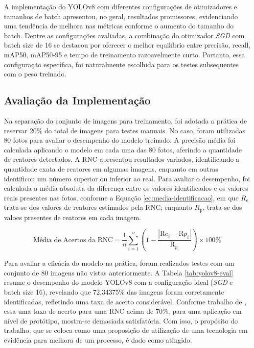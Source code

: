 A implementação do YOLOv8 com diferentes configurações de otimizadores e tamanhos de batch apresentou, no geral, resultados promissores, evidenciando uma tendência de melhora nas métricas conforme o aumento do tamanho do batch. Dentre as configurações avaliadas, a combinação do otimizador \textit{SGD} com batch size de 16 se destacou por oferecer o melhor equilíbrio entre precisão, recall, mAP50, mAP50-95 e tempo de treinamento razoavelmente curto. Portanto, essa configuração específica, foi naturalmente escolhida para os testes subsequentes com o peso treinado.

\subsection{Avaliação da Implementação}

Na separação do conjunto de imagens para treinamento, foi adotada a prática de reservar 20\% do total de imagens para testes manuais. No caso, foram utilizadas 80 fotos para avaliar o desempenho do modelo treinado. A precisão média foi calculada aplicando o modelo em cada uma das 80 fotos, aferindo a quantidade de reatores detectados. A RNC apresentou resultados variados, identificando a quantidade exata de reatores em algumas imagens, enquanto em outras identificou um número superior ou inferior ao real. Para avaliar o desempenho, foi calculada a média absoluta da diferença entre os valores identificados e os valores reais presentes nas fotos, conforme a Equação \eqref{eq:media-identificacao}, em que \( R_{\text{e}} \) trata-se dos valores de reatores estimados pela RNC; enquanto \( R_{\text{p}} \), trata-se dos valoes presentes de reatores em cada imagem.

\begin{equation} \text{Média de Acertos da RNC} = \frac{1}{n} \sum_{i=1}^{n} \left(1 - \frac{|\text{R}{e_i} - \text{R}{p_i}|}{\text{R}_{p_i}}\right) \times 100\% \label{eq:media-identificacao} \end{equation}

Para avaliar a eficácia do modelo na prática, foram realizados testes com um conjunto de 80 imagens não vistas anteriormente. A Tabela \ref{tab:yolov8-eval} resume o desempenho do modelo YOLOv8 com a configuração ideal (\textit{SGD} e batch size 16), revelando que 72,34375\% das imagens foram corretamente identificadas, refletindo uma taxa de acerto considerável. Conforme trabalho de \cite{barbado2022aplicaccao}, essa uma taxa de acerto para uma RNC acima de 70\%, para uma aplicação em nível de protótipo, mostra-se demasiada satisfatória. Com isso, o propósito do trabalho, que se coloca como uma proposição de utilização de uma tecnologia em evidência para melhora de um processo, é dado como atingido. 

